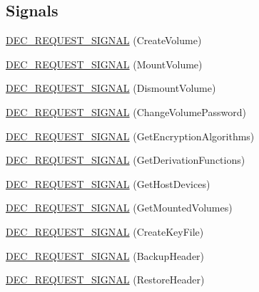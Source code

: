 \subsection*{Signals}
\begin{DoxyCompactItemize}
\item 
\hyperlink{class_gost_crypt_1_1_core_1_1_core_base_a736471460c0b496c3399140ebbe9b009}{D\+E\+C\+\_\+\+R\+E\+Q\+U\+E\+S\+T\+\_\+\+S\+I\+G\+N\+AL} (Create\+Volume)
\item 
\hyperlink{class_gost_crypt_1_1_core_1_1_core_base_a0492935c124dd71e4d18d3e7626845d1}{D\+E\+C\+\_\+\+R\+E\+Q\+U\+E\+S\+T\+\_\+\+S\+I\+G\+N\+AL} (Mount\+Volume)
\item 
\hyperlink{class_gost_crypt_1_1_core_1_1_core_base_a9d651ef51f082537fc8e67a070a62f4a}{D\+E\+C\+\_\+\+R\+E\+Q\+U\+E\+S\+T\+\_\+\+S\+I\+G\+N\+AL} (Dismount\+Volume)
\item 
\hyperlink{class_gost_crypt_1_1_core_1_1_core_base_a93a687375f754bd009c7f08c980eb3fa}{D\+E\+C\+\_\+\+R\+E\+Q\+U\+E\+S\+T\+\_\+\+S\+I\+G\+N\+AL} (Change\+Volume\+Password)
\item 
\hyperlink{class_gost_crypt_1_1_core_1_1_core_base_a88ea9bf4214ab3966b470781e658315c}{D\+E\+C\+\_\+\+R\+E\+Q\+U\+E\+S\+T\+\_\+\+S\+I\+G\+N\+AL} (Get\+Encryption\+Algorithms)
\item 
\hyperlink{class_gost_crypt_1_1_core_1_1_core_base_aa203359ccaa75e4017b38fc953e27604}{D\+E\+C\+\_\+\+R\+E\+Q\+U\+E\+S\+T\+\_\+\+S\+I\+G\+N\+AL} (Get\+Derivation\+Functions)
\item 
\hyperlink{class_gost_crypt_1_1_core_1_1_core_base_aae04e91d01afa32fd727421001f6da1f}{D\+E\+C\+\_\+\+R\+E\+Q\+U\+E\+S\+T\+\_\+\+S\+I\+G\+N\+AL} (Get\+Host\+Devices)
\item 
\hyperlink{class_gost_crypt_1_1_core_1_1_core_base_a5eca68482d0201fe3161b2b6eb967367}{D\+E\+C\+\_\+\+R\+E\+Q\+U\+E\+S\+T\+\_\+\+S\+I\+G\+N\+AL} (Get\+Mounted\+Volumes)
\item 
\hyperlink{class_gost_crypt_1_1_core_1_1_core_base_adee6427ebd0aa9a947ea34f6aa0878e3}{D\+E\+C\+\_\+\+R\+E\+Q\+U\+E\+S\+T\+\_\+\+S\+I\+G\+N\+AL} (Create\+Key\+File)
\item 
\hyperlink{class_gost_crypt_1_1_core_1_1_core_base_a089f39a7f077a224362509768cf6b1b3}{D\+E\+C\+\_\+\+R\+E\+Q\+U\+E\+S\+T\+\_\+\+S\+I\+G\+N\+AL} (Backup\+Header)
\item 
\hyperlink{class_gost_crypt_1_1_core_1_1_core_base_a93213c56a4a5e3b5042cc9e2a130a62a}{D\+E\+C\+\_\+\+R\+E\+Q\+U\+E\+S\+T\+\_\+\+S\+I\+G\+N\+AL} (Restore\+Header)
\item 

\end{DoxyCompactItemize}
